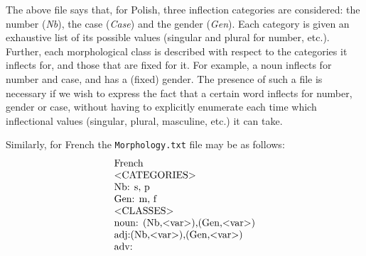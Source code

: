\bigskip
\noindent The above file says that, for Polish, three inflection categories are 
considered: the number (\emph{Nb}), the case (\emph{Case}) and the gender (\emph{Gen}). 
Each category is given an exhaustive list of its possible values (singular and plural 
for number, etc.). Further, each morphological class is described with respect to the 
categories it inflects for, and those that are fixed for it. For example, a noun inflects 
for  number and case, and has a (fixed) gender. The presence of such a file is necessary 
if we wish to express the fact that a certain word inflects for number, gender or case, 
without having to explicitly enumerate each time which inflectional values (singular, 
plural, masculine, etc.) it can take.

\bigskip
\noindent Similarly, for French the \verb+Morphology.txt+ file may be as
follows:
\[
\begin{array}[c]{l}
$French$ \\
$$<$CATEGORIES$>$$ \\
$Nb: s, p$ \\
$Gen: m, f$ \\
$$<$CLASSES$>$$\\
$noun: (Nb,$<$var$>$),(Gen,$<$var$>$)$ \\
$adj:(Nb,$<$var$>$),(Gen,$<$var$>$)$ \\
$adv:$
\end{array}
\]

